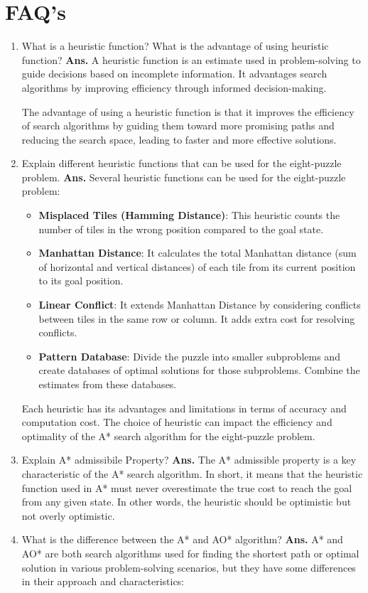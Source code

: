 \documentclass{article}
\begin{document}
\section{\textbf{FAQ's}}
\begin{enumerate}
    \item What is a heuristic function? What is the advantage of using heuristic function?
    \textbf{Ans.} A heuristic function is an estimate used in problem-solving to guide decisions based on incomplete information. It advantages search algorithms by improving efficiency through informed decision-making.

    The advantage of using a heuristic function is that it improves the efficiency of search algorithms by guiding them toward more promising paths and reducing the search space, leading to faster and more effective solutions.
    \item Explain different heuristic functions that can be used for the eight-puzzle problem.
    \textbf{Ans.} Several heuristic functions can be used for the eight-puzzle problem:
    \begin{itemize}
        \item \textbf{Misplaced Tiles (Hamming Distance)}: This heuristic counts the number of tiles in the wrong position compared to the goal state.
        \item \textbf{Manhattan Distance}: It calculates the total Manhattan distance (sum of horizontal and vertical distances) of each tile from its current position to its goal position.
        \item \textbf{Linear Conflict}: It extends Manhattan Distance by considering conflicts between tiles in the same row or column. It adds extra cost for resolving conflicts.
        \item \textbf{Pattern Database}: Divide the puzzle into smaller subproblems and create databases of optimal solutions for those subproblems. Combine the estimates from these databases.
    \end{itemize}
    
    Each heuristic has its advantages and limitations in terms of accuracy and computation cost. The choice of heuristic can impact the efficiency and optimality of the A* search algorithm for the eight-puzzle problem.
    \item Explain A* admissibile Property?
    \textbf{Ans.} The A* admissible property is a key characteristic of the A* search algorithm. In short, it means that the heuristic function used in A* must never overestimate the true cost to reach the goal from any given state. In other words, the heuristic should be optimistic but not overly optimistic.
    \item What is the difference between the A* and AO* algorithm?
    \textbf{Ans.} A* and AO* are both search algorithms used for finding the shortest path or optimal solution in various problem-solving scenarios, but they have some differences in their approach and characteristics:


\end{enumerate}
\end{document}
